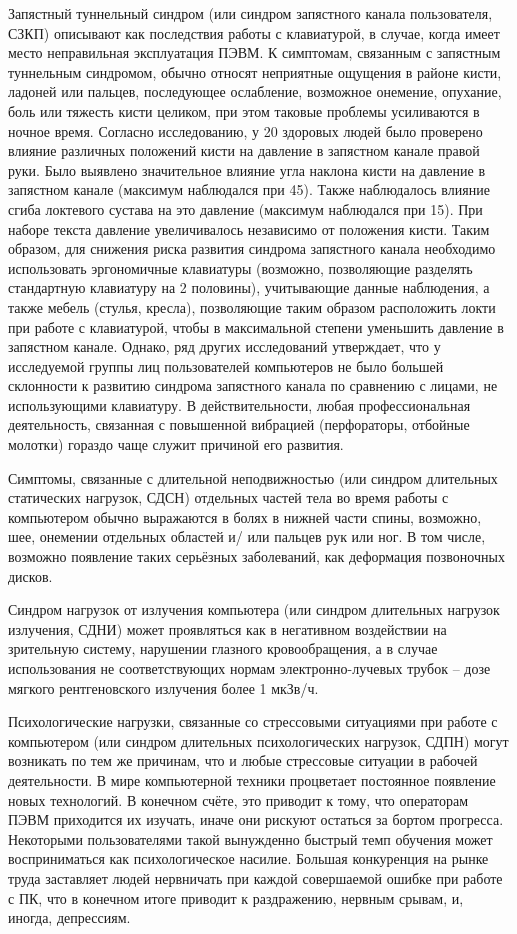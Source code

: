 Запястный туннельный синдром (или синдром запястного канала пользователя, СЗКП) описывают как последствия работы с клавиатурой, в случае, когда имеет место неправильная эксплуатация ПЭВМ. К симптомам, связанным с запястным туннельным синдромом, обычно относят неприятные ощущения в районе кисти, ладоней или пальцев, последующее ослабление, возможное онемение, опухание, боль или тяжесть кисти целиком, при этом таковые проблемы усиливаются в ночное время. Согласно исследованию, у 20 здоровых людей было проверено влияние различных положений кисти на давление в запястном канале правой руки\cite{WRISTPOSTURE}. Было выявлено значительное влияние угла наклона кисти на давление в запястном канале (максимум наблюдался при 45\degree). Также наблюдалось влияние сгиба локтевого сустава на это давление (максимум наблюдался при 15\degree). При наборе текста давление увеличивалось независимо от положения кисти. Таким образом, для снижения риска развития синдрома запястного канала необходимо использовать эргономичные клавиатуры (возможно, позволяющие разделять стандартную клавиатуру на 2 половины), учитывающие данные наблюдения, а также мебель (стулья, кресла), позволяющие таким образом расположить локти при работе с клавиатурой, чтобы в максимальной степени уменьшить давление в запястном канале. Однако, ряд других исследований  утверждает, что у исследуемой группы лиц пользователей компьютеров не было большей склонности к развитию синдрома запястного канала по сравнению с лицами, не использующими клавиатуру\cite{CARPALTUNNEL}. В действительности, любая профессиональная деятельность, связанная с повышенной вибрацией (перфораторы, отбойные молотки) гораздо чаще служит причиной его развития.

Симптомы, связанные с длительной неподвижностью (или синдром длительных статических нагрузок, СДСН) отдельных частей тела во время работы с компьютером обычно выражаются в болях в нижней части спины, возможно, шее, онемении отдельных областей и/ или пальцев рук или ног. В том числе, возможно появление таких серьёзных заболеваний, как деформация позвоночных дисков.

Синдром нагрузок от излучения компьютера (или синдром длительных нагрузок излучения, СДНИ) может проявляться как в негативном воздействии на зрительную систему, нарушении глазного кровообращения, а в случае использования не соответствующих нормам электронно-лучевых трубок – дозе мягкого рентгеновского излучения более 1 мкЗв/ч\cite{SANPIN}.

Психологические нагрузки, связанные со стрессовыми ситуациями при работе с компьютером (или синдром длительных психологических нагрузок, СДПН) могут возникать по тем же причинам, что и любые стрессовые ситуации в рабочей деятельности. В мире компьютерной техники процветает постоянное появление новых технологий. В конечном счёте, это приводит к тому, что операторам ПЭВМ приходится их изучать, иначе они рискуют остаться за бортом прогресса. Некоторыми пользователями такой вынужденно быстрый темп обучения может восприниматься как психологическое насилие. Большая конкуренция на рынке труда заставляет людей нервничать при каждой совершаемой ошибке при работе с ПК, что в конечном итоге приводит к раздражению, нервным срывам, и, иногда, депрессиям.

